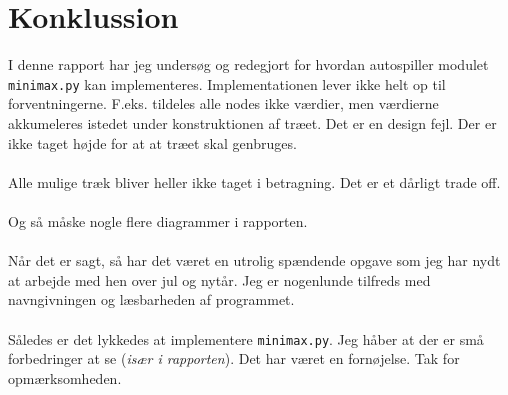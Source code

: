 \section{Konklussion}
I denne rapport har jeg undersøg og redegjort for hvordan autospiller modulet \texttt{minimax.py}
kan implementeres. Implementationen lever ikke helt op til forventningerne. F.eks. tildeles
alle nodes ikke værdier, men værdierne akkumeleres istedet under konstruktionen af træet.
Det er en design fejl. Der er ikke taget højde for at at træet skal genbruges.\\
\\
Alle mulige træk bliver heller ikke taget i betragning. Det er et dårligt trade off.\\
\\
Og så måske nogle flere diagrammer i rapporten.\\
\\
Når det er sagt, så har det været en utrolig spændende opgave som jeg har nydt at
arbejde med hen over jul og nytår. Jeg er nogenlunde tilfreds med navngivningen og
læsbarheden af programmet.\\
\\
Således er det lykkedes at implementere \texttt{minimax.py}. Jeg håber at der er
små forbedringer at se (\textit{især i rapporten}). Det har været en fornøjelse.
Tak for opmærksomheden.